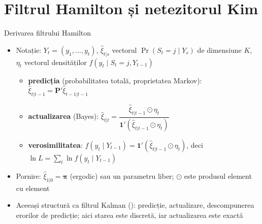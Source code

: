 \section{Filtrul Hamilton și netezitorul Kim}

\begin{frame}{Derivarea filtrului Hamilton}
\itemsize{\small}
\begin{itemize}
    \item Notație: $Y_t = (y_1, \dots, y_t)$, $\hat\xi_{t|s}$ vectorul $\Pr(S_t = j \mid Y_s)$ de dimensiune $K$, $\eta_t$ vectorul densităților $f(y_t \mid S_t = j, Y_{t-1})$
    \begin{itemize}
        \item \textbf{predicția} (probabilitatea totală, proprietatea Markov): $\hat\xi_{t|t-1} = \mathbf{P}'\hat\xi_{t-1|t-1}$
        \item \textbf{actualizarea} (Bayes): $\hat\xi_{t|t} = \dfrac{\hat\xi_{t|t-1}\odot\eta_t}{\mathbf{1}'(\hat\xi_{t|t-1}\odot\eta_t)}$
        \item \textbf{verosimilitatea}: $f(y_t \mid Y_{t-1}) = \mathbf{1}'(\hat\xi_{t|t-1}\odot\eta_t)$, deci $\ln L = \sum_t \ln f(y_t \mid Y_{t-1})$
    \end{itemize}
    \item Pornire: $\hat\xi_{1|0} = \boldsymbol\pi$ (ergodic) sau un parametru liber; $\odot$ este produsul element cu element
    \item Aceeași structură ca filtrul Kalman (): predicție, actualizare, descompunerea erorilor de predicție; aici starea este discretă, iar actualizarea este exactă
\end{itemize}
\end{frame}

